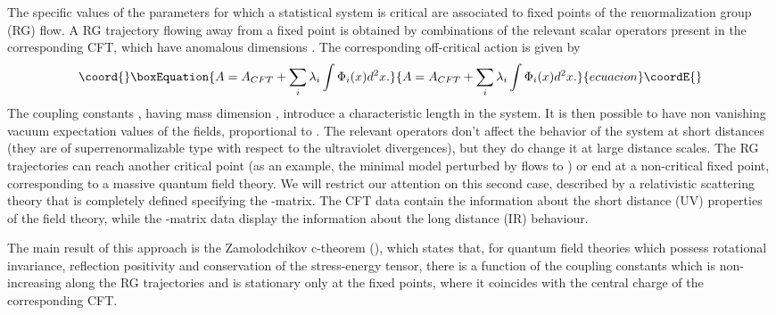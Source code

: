 \documentclass[a4paper,12pt]{report}
\begin{document}
The specific values of the parameters for which a statistical system is critical are associated to fixed points of
the renormalization group (RG) flow. A RG trajectory flowing away from a fixed point is obtained by combinations
of the relevant scalar operators \coordHE{} present in the corresponding CFT, which have anomalous dimensions
\coordHE{}. The corresponding off-critical action is given by
\begin{equation}\coord{}\boxEquation{\label{action}
A=A_{CFT}+\sum _{i}\lambda _{i}\int\Phi _{i}(x)d^{2}x.
}{A=A_{CFT}+\sum _{i}\lambda _{i}\int\Phi _{i}(x)d^{2}x.
}{ecuacion}\coordE{}\end{equation}
The coupling constants \coordHE{}, having mass dimension \coordHE{}, introduce a
characteristic length in the system. It is then possible to have non vanishing vacuum expectation values of the
fields, proportional to \coordHE{}. The relevant operators don't affect
the behavior of the system at short distances (they are of superrenormalizable type with respect to the
ultraviolet divergences), but they do change it at large distance scales. The RG trajectories can reach another
critical point (as an example, the minimal model \coordHE{} perturbed by \coordHE{} flows to \coordHE{}) or end at a non-critical fixed point, corresponding to a massive quantum field theory. We will
restrict our attention on this second case, described by a relativistic scattering theory that is completely
defined specifying the \coordHE{}-matrix. The CFT data contain the information about the short distance (UV) properties
of the field theory, while the \coordHE{}-matrix data display the information about the long distance (IR) behaviour.

The main result of this approach is the Zamolodchikov c-theorem (\cite{zamcth}), which states that, for quantum
field theories which possess rotational invariance, reflection positivity and conservation of the stress-energy
tensor, there is a function \coordHE{} of the coupling constants \coordHE{} which is
non-increasing along the RG trajectories and is stationary only at the fixed points, where it coincides with the
central charge \coordHE{} of the corresponding CFT.
\end{document}
